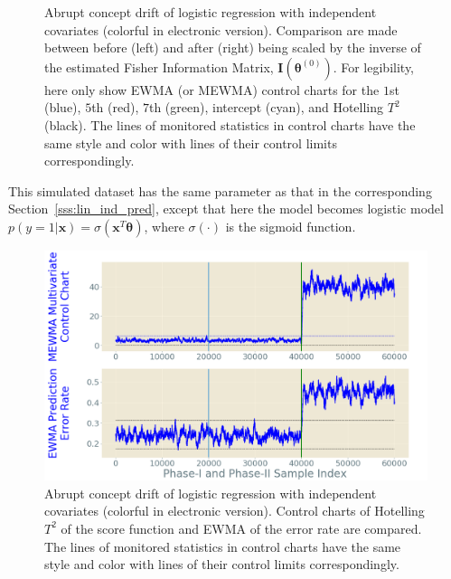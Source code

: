\documentclass[twoside,11pt]{article}
\begin{document}
\begin{enumerate}[(I)]
\begin{figure}[!htbp]
  \caption{Abrupt concept drift of logistic regression with independent {covariates} (colorful in electronic version). Comparison are made between before (left) and after (right) being scaled by {the inverse of the estimated} Fisher Information Matrix, {$\mathbf {I} ( {\bm{\theta}} ^{(0)})$.} For legibility, here only show EWMA (or MEWMA) control charts for the $1$st (blue), $5$th (red), $7$th (green), intercept (cyan), and Hotelling $T^2$ (black). The lines of monitored statistics in control charts have the same style and color with lines of their control limits correspondingly.}
  \label{fig:log_reg_ind_X}
\end{figure}

This simulated dataset has the same parameter as that in the corresponding Section~\ref{sss:lin_ind_pred}, except that here the model becomes {logistic model} {$p(y=1|\bm {x})= \sigma (\bm {x}^T\bm { \theta})$,} where $\sigma (\cdot)$ is the sigmoid function.
\begin{figure}[!htbp]
\centering
\includegraphics[width = 0.6\linewidth]{../figures/v14/sim_5/logi_no_muco/1_sim5_logi_1e-08_0_005_1.png}
  \caption{Abrupt concept drift of logistic regression with independent covariates (colorful in electronic version). Control charts of Hotelling $T^2$ of the score function and EWMA of the error rate are compared. The lines of monitored statistics in control charts have the same style and color with lines of their control limits correspondingly.}
  \label{fig:log_reg_ind_X_comp}
\end{figure}


\end{enumerate}
\end{document}
